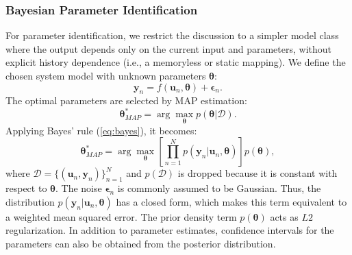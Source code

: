 \subsubsection{Bayesian Parameter Identification}
For parameter identification, we restrict the discussion to a simpler model class where the output depends only on the current input and parameters, without explicit history dependence (i.e., a memoryless or static mapping). We define the chosen system model with unknown parameters $\boldsymbol{\theta}$:
\begin{equation}
    \boldsymbol{y}_n=f(\boldsymbol{u}_n, \boldsymbol{\theta})+\boldsymbol{\epsilon}_n.
\end{equation}
The optimal parameters are selected by \ac{MAP} estimation:
\begin{equation}
    \boldsymbol{\theta}^*_{MAP}=\arg \max_{\boldsymbol{\theta}}p(\boldsymbol{\theta}|\mathcal{D}).
\end{equation}
Applying Bayes' rule (\ref{eq:bayes}), it becomes:
\begin{equation}
    \boldsymbol{\theta}^*_{MAP}=\arg \max_{\boldsymbol{\theta}}\left[\prod_{n=1}^{N} p(\boldsymbol{y}_n|\boldsymbol{u}_n,\boldsymbol{\theta})\right]p(\boldsymbol{\theta}),
\end{equation}
where $\mathcal{D}=\{(\boldsymbol{u}_n,\boldsymbol{y}_n)\}_{n=1}^{N}$ and $p(\mathcal{D})$ is dropped because it is constant with respect to $\boldsymbol{\theta}$. The noise $\boldsymbol{\epsilon}_n$ is commonly assumed to be Gaussian. Thus, the distribution $p(\boldsymbol{y}_n|\boldsymbol{u}_n,\boldsymbol{\theta})$ has a closed form, which makes this term equivalent to a weighted mean squared error. The prior density term $p(\boldsymbol{\theta})$ acts as $L2$ regularization.
In addition to parameter estimates, confidence intervals for the parameters can also be obtained from the posterior distribution.


